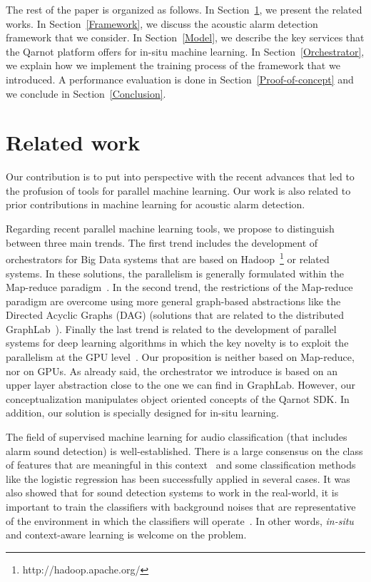 \documentclass[10pt, conference, compsocconf]{IEEEtran}
\begin{document}
The rest of the paper is organized as follows. In Section~\ref{Related}, we present the related works. 
In Section~\ref{Framework}, we discuss the acoustic alarm detection framework that we consider. In Section~\ref{Model}, we describe 
the key services that the Qarnot platform offers for in-situ machine learning. In Section~\ref{Orchestrator}, we explain 
how we implement the training process of the framework that we introduced. A performance evaluation is done in 
Section~\ref{Proof-of-concept} and we conclude in Section~\ref{Conclusion}.

\section{Related work} \label{Related}

Our contribution is to put into perspective with the recent advances that led to the profusion of tools for parallel 
machine learning. Our work is also related to prior contributions in machine learning for acoustic alarm detection. 

Regarding recent parallel machine learning tools, we propose to distinguish between three main trends. 
The first trend includes the development of orchestrators for Big Data systems that are based on Hadoop~\footnote{http://hadoop.apache.org/} or related systems. 
In these solutions, the parallelism is generally formulated within the Map-reduce paradigm~\cite{DBLP:journals/cacm/DeanG10}. 
In the second trend, the restrictions of the Map-reduce paradigm are overcome using more general graph-based abstractions like 
the Directed Acyclic Graphs (DAG) (solutions that are related to the distributed GraphLab~\cite{Low:2012:DGF:2212351.2212354}).  Finally the last trend is related to the development of parallel systems for deep learning algorithms in which the key novelty is to exploit the parallelism at the GPU level~\cite{Raina:2009:LDU:1553374.1553486}.
Our proposition is neither based on Map-reduce, nor on GPUs. As already said, the orchestrator we introduce 
is based on an upper layer abstraction close to the one we can find in GraphLab. However, our conceptualization manipulates object 
oriented concepts of the Qarnot SDK. In addition, our solution is specially designed for in-situ learning. 

The field of supervised machine learning for audio classification (that includes alarm sound detection) is well-established. There is a large consensus on the class of features that are meaningful in this context~\cite{Mckinney03featuresfor,DBLP:journals/taslp/JoderER09} 
and some classification methods like the logistic regression has been successfully applied in several cases. It was also showed 
that for sound detection systems to work in the real-world, it is important to train the classifiers with 
background noises that are representative of the environment in which the classifiers will operate~\cite{DBLP:conf/icassp/SalamonB15}. 
In other words, {\it in-situ} and context-aware learning is welcome on the problem. 
\end{document}
